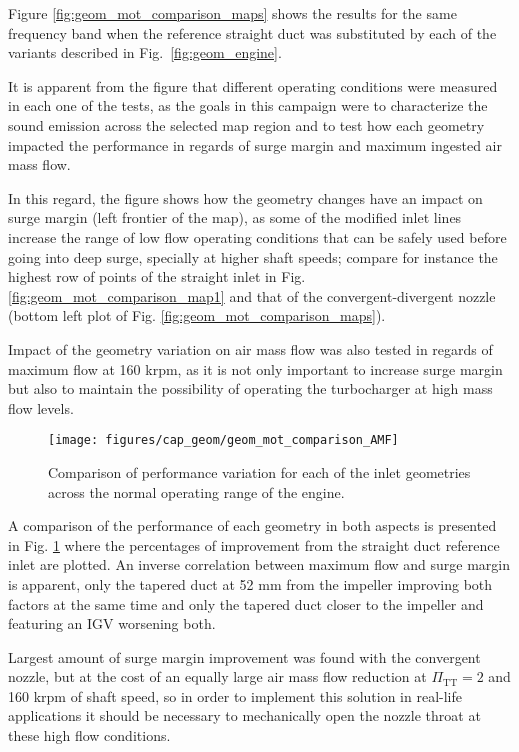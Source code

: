 Figure \ref{fig:geom_mot_comparison_maps} shows the results for the same frequency band when the reference straight duct was substituted by each of the variants described in Fig.~\ref{fig:geom_engine}. 

It is apparent from the figure that different operating conditions were measured in each one of the tests, as the goals in this campaign were to characterize the sound emission across the selected map region and to test how each geometry impacted the performance in regards of surge margin and maximum ingested air mass flow.

In this regard, the figure shows how the geometry changes have an impact on surge margin (left frontier of the map), as some of the modified inlet lines increase the range of low flow operating conditions that can be safely used before going into deep surge, specially at higher shaft speeds; compare for instance the highest row of points of the straight inlet in Fig. \ref{fig:geom_mot_comparison_map1} and that of the convergent-divergent nozzle (bottom left plot of Fig. \ref{fig:geom_mot_comparison_maps}).

Impact of the geometry variation on air mass flow was also tested in regards of maximum flow at 160 krpm, as it is not only important to increase surge margin but also to maintain the possibility of operating the turbocharger at high mass flow levels. 

\begin{figure}[t!]
\centering
\texttt{[image: figures/cap\_geom/geom\_mot\_comparison\_AMF]}
\caption[Comparison of performance variation]{Comparison of performance variation for each of the inlet geometries across the normal operating range of the engine.}
\label{fig:geom_mot_comparison_AMF}
\end{figure}

A comparison of the performance of each geometry in both aspects is presented in Fig. \ref{fig:geom_mot_comparison_AMF} where the percentages of improvement from the straight duct reference inlet are plotted. An inverse correlation between maximum flow and surge margin is apparent, only the tapered duct at 52 mm from the impeller improving both factors at the same time and only the tapered duct closer to the impeller and featuring an IGV worsening both.

Largest amount of surge margin improvement was found with the convergent nozzle, but at the cost of an equally large air mass flow reduction at $\Pi_\text{TT} = 2$ and 160 krpm of shaft speed, so in order to implement this solution in real-life applications it should be necessary to mechanically open the nozzle throat at these high flow conditions.

